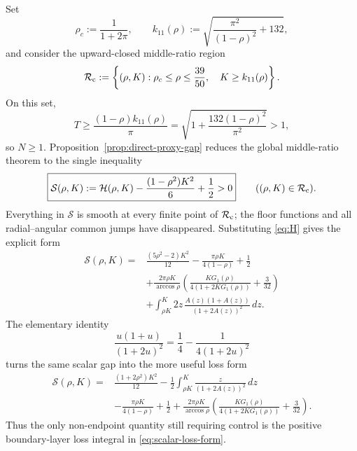 \documentclass[11pt]{article}
\theoremstyle{remark}
\begin{document}
Set
\begin{equation}
 \rho_c:=\frac1{1+2\pi},
 \qquad
 k_{11}(\rho):=
 \sqrt{\frac{\pi^2}{(1-\rho)^2}+132},
 \label{eq:compact-constants}
\end{equation}
and consider the upward-closed middle-ratio region
\begin{equation}
 \mathcal R_{\rm c}:=
 \left\{(\rho,K):
 \rho_c\leq\rho\leq\frac{39}{50},\quad
 K\geq k_{11}(\rho)\right\}.
 \label{eq:compact-region}
\end{equation}
On this set,
\begin{equation}
 T\geq\frac{(1-\rho)k_{11}(\rho)}\pi
 =\sqrt{1+\frac{132(1-\rho)^2}{\pi^2}}>1,
 \label{eq:N-positive}
\end{equation}
so $N\geq1$.  Proposition~\ref{prop:direct-proxy-gap} reduces the global
middle-ratio theorem to the single inequality
\begin{equation}
 \boxed{
 \mathcal S(\rho,K):=
 \mathcal H(\rho,K)
 -\frac{(1-\rho^2)K^2}{6}
 +\frac12>0
 }
 \qquad ((\rho,K)\in\mathcal R_{\rm c}).
 \label{eq:scalar-gap}
\end{equation}
Everything in $\mathcal S$ is smooth at every finite point of
$\mathcal R_{\rm c}$; the floor functions and all radial--angular common
jumps have disappeared.  Substituting \eqref{eq:H} gives the explicit form
\begin{equation}
 \begin{aligned}
 \mathcal S(\rho,K)={}&
 \frac{(5\rho^2-2)K^2}{12}
 -\frac{\pi\rho K}{4(1-\rho)}+\frac12\\
 &+\frac{2\pi\rho K}{\arccos\rho}
   \left(\frac{KG_1(\rho)}{4(1+2KG_1(\rho))}
         +\frac3{32}\right)\\
 &+\int_{\rho K}^{K}
 2z\,\frac{A(z)(1+A(z))}{(1+2A(z))^2}\,dz.
 \end{aligned}
 \label{eq:scalar-expanded}
\end{equation}
The elementary identity
\begin{equation}
 \frac{u(1+u)}{(1+2u)^2}
 =\frac14-\frac{1}{4(1+2u)^2}
 \label{eq:kernel-loss}
\end{equation}
turns the same scalar gap into the more useful loss form
\begin{equation}
 \begin{aligned}
 \mathcal S(\rho,K)={}&
 \frac{(1+2\rho^2)K^2}{12}
 -\frac12\int_{\rho K}^{K}
       \frac{z}{(1+2A(z))^2}\,dz\\
 &-\frac{\pi\rho K}{4(1-\rho)}+\frac12
 +\frac{2\pi\rho K}{\arccos\rho}
   \left(\frac{KG_1(\rho)}{4(1+2KG_1(\rho))}
         +\frac3{32}\right).
 \end{aligned}
 \label{eq:scalar-loss-form}
\end{equation}
Thus the only non-endpoint quantity still requiring control is the
positive boundary-layer loss integral in
\eqref{eq:scalar-loss-form}.
\end{document}
